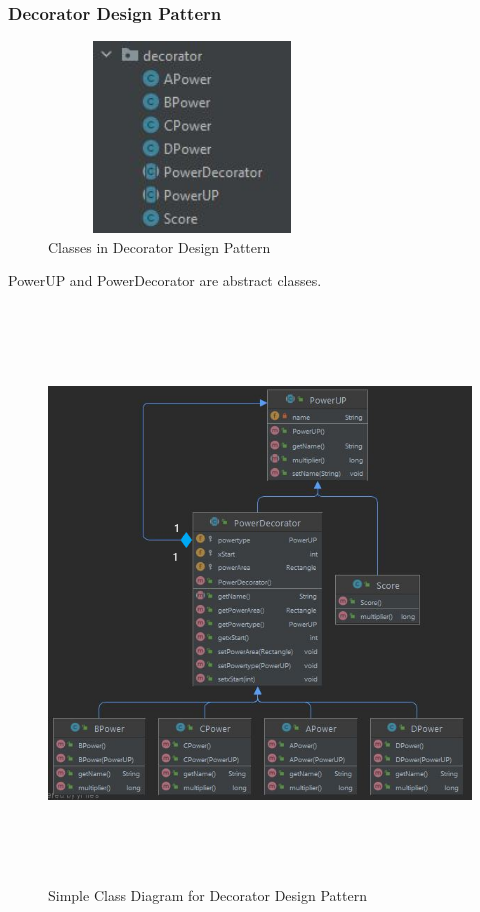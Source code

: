 \documentclass{article}
\begin{document}
\subsubsection{Decorator Design Pattern}
\begin{figure}[H]
    \centering
	\includegraphics[width=3in, height=2in]{t4.JPG}
	\caption[Optional caption]{Classes in Decorator Design Pattern}
	\label{}
\end{figure}
PowerUP and PowerDecorator are abstract classes.
\begin{figure}[H]
    \centering
	\includegraphics[width=7in, height=6in]{t10.png}
	\caption[Optional caption]{Simple Class Diagram for Decorator Design Pattern}
	\label{}
\end{figure}
\end{document}
